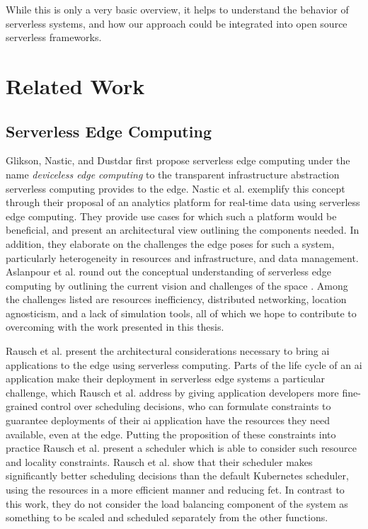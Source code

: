 \documentclass[draft,final]{vutinfth} %
\begin{document}
While this is only a very basic overview, it helps to understand the behavior of serverless systems, and how our approach could be integrated into open source serverless frameworks.

\chapter{Related Work}

\section{Serverless Edge Computing}
Glikson, Nastic, and Dustdar first propose serverless edge computing under the name \textit{deviceless edge computing} to the transparent infrastructure abstraction serverless computing provides to the edge\cite{gliksonDevicelessEdgeComputing2017}.
Nastic et al. exemplify this concept through their proposal of an analytics platform for real-time data using serverless edge computing\cite{nasticServerlessRealTimeData2017}.
They provide use cases for which such a platform would be beneficial, and present an architectural view outlining the components needed.
In addition, they elaborate on the challenges the edge poses for such a system, particularly heterogeneity in resources and infrastructure, and data management\cite{nasticServerlessRealTimeData2017}.
Aslanpour et al. round out the conceptual understanding of serverless edge computing by outlining the current vision and challenges of the space \cite{aslanpourServerlessEdgeComputing2021}.
Among the challenges listed are resources inefficiency, distributed networking, location agnosticism, and a lack of simulation tools\cite{aslanpourServerlessEdgeComputing2021}, all of which we hope to contribute to overcoming with the work presented in this thesis.

Rausch et al.\cite{rauschServerlessPlatformEdge} present the architectural considerations necessary to bring \gls{ai} applications to the edge using serverless computing.
Parts of the life cycle of an \gls{ai} application make their deployment in serverless edge systems a particular challenge\cite{aslanpourServerlessEdgeComputing2021}, which Rausch et al. address by giving application developers more fine-grained control over scheduling decisions\cite{rauschServerlessPlatformEdge}, who can formulate constraints to guarantee deployments of their \gls{ai} application have the resources they need available, even at the edge.
Putting the proposition of these constraints into practice Rausch et al. present a scheduler which is able to consider such resource and locality constraints\cite{skippy}.
Rausch et al. show that their scheduler makes significantly better scheduling decisions than the default Kubernetes scheduler, using the resources in a more efficient manner and reducing \gls{fet}\cite{skippy}. In contrast to this work, they do not consider the load balancing component of the system as something to be scaled and scheduled separately from the other functions.
\end{document}
